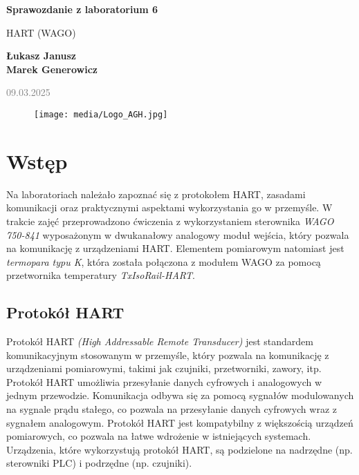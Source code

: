 \documentclass{article}
\begin{document}
\begin{titlepage}
    \begin{center}
        \vspace*{1cm}
            
        \Huge
        \textbf{Sprawozdanie z laboratorium 6}
            
        \vspace{0.5cm}
        \LARGE
        HART (WAGO)
            
        \vspace{1.5cm}
            
        \textbf{Łukasz Janusz\\Marek Generowicz}

        \normalsize      
        \textcolor{gray}{09.03.2025}
        \vfill
        \begin{figure}[hb]
            \centering
            \texttt{[image: media/Logo\_AGH.jpg]}
        \end{figure}   
    \end{center}
\end{titlepage}

\section{Wstęp}
Na laboratoriach należało zapoznać się z protokołem HART, zasadami komunikacji oraz praktycznymi aspektami wykorzystania go w przemyśle. W trakcie zajęć przeprowadzono ćwiczenia z wykorzystaniem sterownika \textit{WAGO 750-841} wyposażonym w dwukanałowy analogowy moduł wejścia, który pozwala na komunikację z urządzeniami HART. Elementem pomiarowym natomiast jest \textit{termopara typu K}, która została połączona z modułem WAGO za pomocą przetwornika temperatury \textit{TxIsoRail-HART}. 
\subsection{Protokół HART}
Protokół HART \textit{(High Addressable Remote Transducer)} jest standardem komunikacyjnym stosowanym w przemyśle, który pozwala na komunikację z urządzeniami pomiarowymi, takimi jak czujniki, przetworniki, zawory, itp. Protokół HART umożliwia przesyłanie danych cyfrowych i analogowych w jednym przewodzie. Komunikacja odbywa się za pomocą sygnałów modulowanych na sygnale prądu stałego, co pozwala na przesyłanie danych cyfrowych wraz z sygnałem analogowym. Protokół HART jest kompatybilny z większością urządzeń pomiarowych, co pozwala na łatwe wdrożenie w istniejących systemach. Urządzenia, które wykorzystują protokół HART, są podzielone na nadrzędne (np. sterowniki PLC) i podrzędne (np. czujniki).
\end{document}
